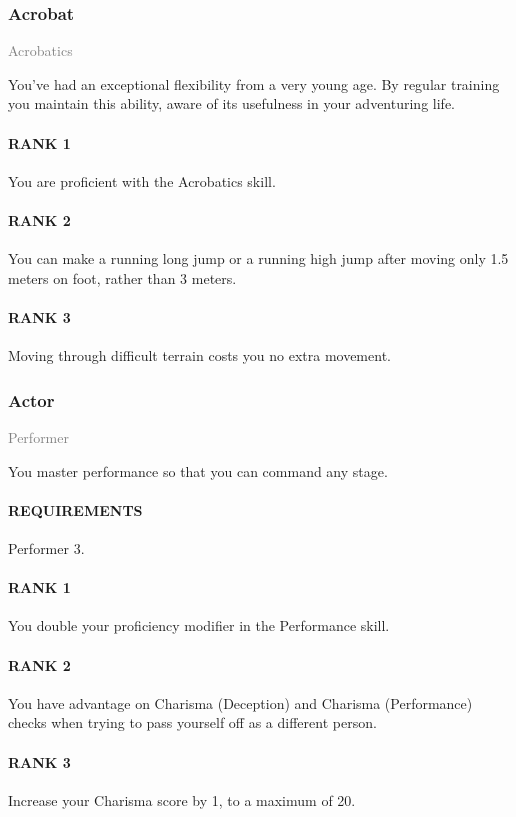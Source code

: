 \subsubsection{Acrobat} \label{feat::acrobat}
\small{\textcolor{gray}{Acrobatics}}

\normalsize
You've had an exceptional flexibility from a very young age.
By regular training you maintain this ability, aware of its usefulness in your adventuring life.
\paragraph{RANK 1} You are proficient with the Acrobatics skill.
\paragraph{RANK 2} You can make a running long jump or a running high jump after moving only 1.5 meters on foot, rather than 3 meters.
\paragraph{RANK 3} Moving through difficult terrain costs you no extra movement.

\subsubsection{Actor} \label{feat::actor}
\small{\textcolor{gray}{Performer}}

\normalsize
You master performance so that you can command any stage.
\paragraph{REQUIREMENTS} Performer 3.
\paragraph{RANK 1} You double your proficiency modifier in the Performance skill.
\paragraph{RANK 2} You have advantage on Charisma (Deception) and Charisma (Performance) checks when trying to pass yourself off as a different person.
\paragraph{RANK 3} Increase your Charisma score by 1, to a maximum of 20.

